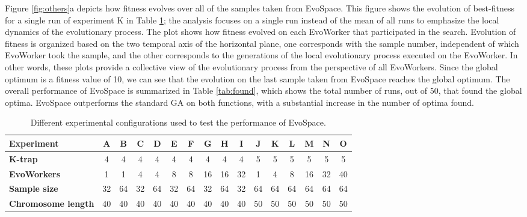 Figure \ref{fig:others}a depicts how fitness evolves over all of the samples taken from EvoSpace.
This figure shows the evolution of best-fitness for a single run of experiment K in Table \ref{tab:exp};
the analysis focuses on a single run instead of the mean of all runs to emphasize the local dynamics of the evolutionary process.
The plot shows how fitness evolved on each EvoWorker that participated in the search.
Evolution of fitness is organized based on the two temporal axis of the horizontal plane,
one corresponds with the sample number, independent of which EvoWorker took the sample, and the other corresponds
to the generations of the local evolutionary process executed on the EvoWorker.
In other words, these plots provide a collective view of the evolutionary process from the perspective of all EvoWorkers.
Since the global optimum is a fitness value of 10, we can see that the evolution on the last sample taken from EvoSpace reaches the global optimum.
The overall performance of EvoSpace is summarized in Table \ref{tab:found}, which shows the total number of runs, out of $50$,
that found the global optima.
EvoSpace outperforms the standard GA on both functions, with a substantial increase in the number of optima found.

\begin{table}[t]
\caption{Different experimental configurations used to test the performance of EvoSpace.}
\centering
\tiny
\begin{tabular}{|l||c|c|c|c|c|c|c|c|c|c|c|c|c|c|c|}
   \hline
             \textbf{Experiment} 	& A & B & C & D & E & F & G & H & I & J & K & L & M & N & O \\

   \hline
               \textbf{K-trap}   	& 4  & 4  & 4  & 4  & 4  & 4  & 4  & 4  & 4 & 5 & 5 & 5 & 5 & 5 & 5 \\
			   \textbf{EvoWorkers}  & 1  & 1  & 4  & 4  & 8  & 8  & 16 & 16 & 32 & 1 & 4 & 8 & 16 & 32 & 40 \\
			   \textbf{Sample size} & 32 & 64 & 32 & 64 & 32 & 64 & 32 & 64 & 32 & 64 & 64 & 64 & 64 & 64 & 64 \\
			   \textbf{Chromosome length} & 40 & 40 & 40 & 40 & 40 & 40 & 40 & 40 & 40 & 50 & 50 & 50 & 50 & 50 & 50 \\
   \hline
\end{tabular}
\label{tab:exp}
\end{table}


